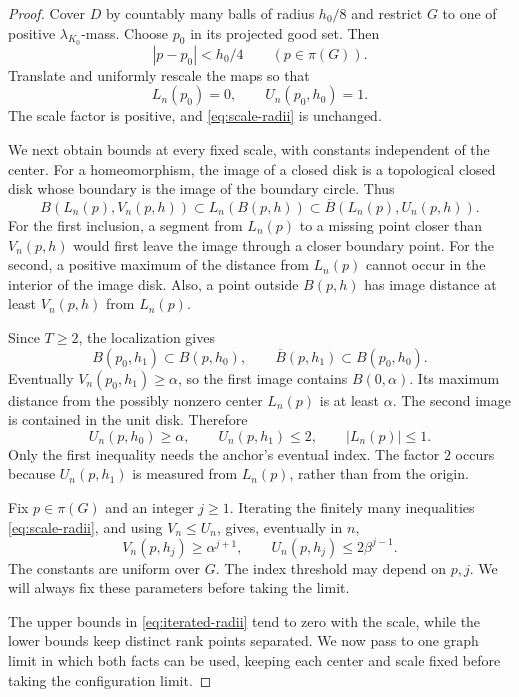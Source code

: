 \begin{proof}
Cover $D$ by countably many balls of radius $h_0/8$ and restrict $G$ to
one of positive $\lambda_{K_0}$-mass.  Choose $p_0$ in its projected good
set.  Then
\[
 |p-p_0|<h_0/4\qquad(p\in\pi(G)).
\]
Translate and uniformly rescale the maps so that
\[
 L_n(p_0)=0,\qquad U_n(p_0,h_0)=1.
\]
The scale factor is positive, and \eqref{eq:scale-radii} is unchanged.

We next obtain bounds at every fixed scale, with constants independent of
the center.  For a homeomorphism, the image of a closed disk is a
topological closed disk whose boundary is the image of the boundary
circle.  Thus
\begin{equation}
 B(L_n(p),V_n(p,h))\subset L_n(B(p,h))
 \subset \overline B(L_n(p),U_n(p,h)).
 \label{eq:radial-enclosure}
\end{equation}
For the first inclusion, a segment from $L_n(p)$ to a missing point
closer than $V_n(p,h)$ would first leave the image through a closer
boundary point.  For the second, a positive maximum of the distance from
$L_n(p)$ cannot occur in the interior of the image disk.  Also, a point
outside $B(p,h)$ has image distance at least $V_n(p,h)$ from $L_n(p)$.

Since $T\ge2$, the localization gives
\[
 B(p_0,h_1)\subset B(p,h_0),
 \qquad
 \overline B(p,h_1)\subset B(p_0,h_0).
\]
Eventually $V_n(p_0,h_1)\ge\alpha$, so the first image contains $B(0,\alpha)$.
Its maximum distance from the possibly nonzero center $L_n(p)$ is at
least $\alpha$.  The second image is contained in the unit disk.  Therefore
\[
 U_n(p,h_0)\ge\alpha,\qquad U_n(p,h_1)\le2,
 \qquad |L_n(p)|\le1.
\]
Only the first inequality needs the anchor's eventual index.  The factor
$2$ occurs because $U_n(p,h_1)$ is measured from $L_n(p)$, rather than
from the origin.

Fix $p\in\pi(G)$ and an integer $j\ge1$.  Iterating the finitely many
inequalities \eqref{eq:scale-radii}, and using $V_n\le U_n$, gives,
eventually in $n$,
\begin{equation}
 V_n(p,h_j)\ge\alpha^{j+1},
 \qquad U_n(p,h_j)\le2\beta^{j-1}.
 \label{eq:iterated-radii}
\end{equation}
The constants are uniform over $G$.  The index threshold may depend on
$p,j$.  We will always fix these parameters before taking the limit.

The upper bounds in \eqref{eq:iterated-radii} tend to zero with the
scale, while the lower bounds keep distinct rank points separated.
We now pass to one graph limit in which both facts can be used, keeping
each center and scale fixed before taking the configuration limit.


\end{proof}
